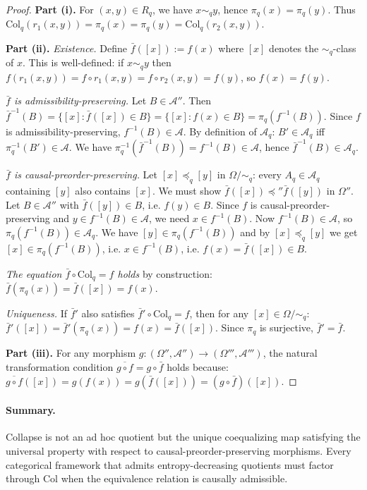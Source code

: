 \documentclass[12pt,a4paper]{article}
\theoremstyle{definition}
\theoremstyle{remark}
\newcommand{\Col}{\ensuremath{\mathrm{Col}}}
\begin{document}
\begin{proof}
\textbf{Part (i).} For $(x,y)\in R_q$, we have $x\sim_q y$, hence
$\pi_q(x)=\pi_q(y)$. Thus $\Col_q(r_1(x,y))=\pi_q(x)=\pi_q(y)=\Col_q(r_2(x,y))$.

\textbf{Part (ii).} \textit{Existence.} Define $\bar{f}([x]):=f(x)$ where $[x]$
denotes the $\sim_q$-class of $x$. This is well-defined: if $x\sim_q y$ then
$f(r_1(x,y))=f\circ r_1(x,y)=f\circ r_2(x,y)=f(y)$, so $f(x)=f(y)$.

\textit{$\bar{f}$ is admissibility-preserving.} Let $B\in\mathcal{A}''$. Then
$\bar{f}^{-1}(B)=\{[x]:\bar{f}([x])\in B\}=\{[x]:f(x)\in B\}=\pi_q(f^{-1}(B))$.
Since $f$ is admissibility-preserving, $f^{-1}(B)\in\mathcal{A}$. By definition of
$\mathcal{A}_q$: $B'\in\mathcal{A}_q$ iff $\pi_q^{-1}(B')\in\mathcal{A}$. We have
$\pi_q^{-1}(\bar{f}^{-1}(B))=f^{-1}(B)\in\mathcal{A}$, hence $\bar{f}^{-1}(B)\in
\mathcal{A}_q$.

\textit{$\bar{f}$ is causal-preorder-preserving.} Let $[x]\preceq_{q}[y]$ in
$\Omega/{\sim_q}$: every $A_q\in\mathcal{A}_q$ containing $[y]$ also contains $[x]$.
We must show $\bar{f}([x])\preceq''\bar{f}([y])$ in $\Omega''$. Let $B\in\mathcal{A}''$
with $\bar{f}([y])\in B$, i.e. $f(y)\in B$. Since $f$ is causal-preorder-preserving
and $y\in f^{-1}(B)\in\mathcal{A}$, we need $x\in f^{-1}(B)$. Now
$f^{-1}(B)\in\mathcal{A}$, so $\pi_q(f^{-1}(B))\in\mathcal{A}_q$. We have
$[y]\in\pi_q(f^{-1}(B))$ and by $[x]\preceq_q[y]$ we get $[x]\in\pi_q(f^{-1}(B))$,
i.e. $x\in f^{-1}(B)$, i.e. $f(x)=\bar{f}([x])\in B$.

\textit{The equation $\bar{f}\circ\Col_q=f$ holds} by construction: $\bar{f}(\pi_q(x))
=\bar{f}([x])=f(x)$.

\textit{Uniqueness.} If $\bar{f}'$ also satisfies $\bar{f}'\circ\Col_q=f$, then for
any $[x]\in\Omega/{\sim_q}$: $\bar{f}'([x])=\bar{f}'(\pi_q(x))=f(x)=\bar{f}([x])$.
Since $\pi_q$ is surjective, $\bar{f}'=\bar{f}$.

\textbf{Part (iii).} For any morphism $g:(\Omega'',\mathcal{A}'')\to
(\Omega''',\mathcal{A}''')$, the natural transformation condition
$\overline{g\circ f}=g\circ\bar{f}$ holds because:
$\overline{g\circ f}([x])=g(f(x))=g(\bar{f}([x]))=(g\circ\bar{f})([x])$.
\end{proof}

\paragraph{Summary.} Collapse is not an ad hoc quotient but the unique coequalizing
map satisfying the universal property with respect to causal-preorder-preserving morphisms.
Every categorical framework that admits entropy-decreasing quotients must factor through
$\Col$ when the equivalence relation is causally admissible.
\end{document}
